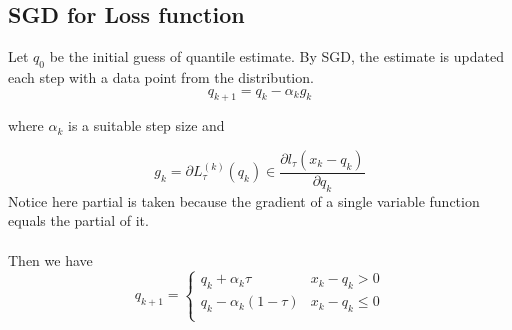 \subsection{SGD for Loss function}

Let $q_0$ be the initial guess of quantile estimate. 
By SGD, the estimate is updated each step with a data point from the distribution.
\begin{equation}
    q_{k+1} = q_k - \alpha_k g_k
\end{equation}

where $ \alpha_k $ is a suitable step size and 

\begin{equation}
    g_k = \partial L_{\tau}^{(k)}(q_k) \in \frac{\partial l_\tau(x_k - q_k)}{\partial q_k}
\end{equation}
{Notice here partial is taken because the gradient of a single variable function equals the partial of it.}
\\\\
Then we have
\begin{equation*}
    q_{k+1} = 
    \begin{cases}
        q_k + \alpha_k \tau               & x_k - q_k > 0\\
        q_k - \alpha_k (1-\tau)           & x_k - q_k \leq 0\\
    \end{cases}
\end{equation*}

